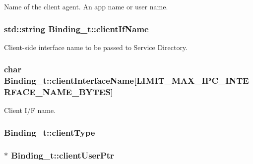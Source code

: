 Name of the client agent. An app name or user name. 

\subsubsection[{\texorpdfstring{client\+If\+Name}{clientIfName}}]{\setlength{\rightskip}{0pt plus 5cm}std\+::string Binding\+\_\+t\+::client\+If\+Name}\hypertarget{struct_binding__t_aa122bf826664a8a3e20023537b441645}{}\label{struct_binding__t_aa122bf826664a8a3e20023537b441645}


Client-\/side interface name to be passed to Service Directory. 

\subsubsection[{\texorpdfstring{client\+Interface\+Name}{clientInterfaceName}}]{\setlength{\rightskip}{0pt plus 5cm}char Binding\+\_\+t\+::client\+Interface\+Name\mbox{[}{\bf L\+I\+M\+I\+T\+\_\+\+M\+A\+X\+\_\+\+I\+P\+C\+\_\+\+I\+N\+T\+E\+R\+F\+A\+C\+E\+\_\+\+N\+A\+M\+E\+\_\+\+B\+Y\+T\+ES}\mbox{]}}\hypertarget{struct_binding__t_a65550847a47f05270050453637324785}{}\label{struct_binding__t_a65550847a47f05270050453637324785}


Client I/F name. 

\subsubsection[{\texorpdfstring{client\+Type}{clientType}}]{ Binding\+\_\+t\+::client\+Type}\hypertarget{struct_binding__t_a38243dcb82462583640d972811c855c0}{}\label{struct_binding__t_a38243dcb82462583640d972811c855c0}
\subsubsection[{\texorpdfstring{client\+User\+Ptr}{clientUserPtr}}]{$\ast$ Binding\+\_\+t\+::client\+User\+Ptr}\hypertarget{struct_binding__t_a15952b8fe0659f16c5f2bbba19b363f0}{}\label{struct_binding__t_a15952b8fe0659f16c5f2bbba19b363f0}


